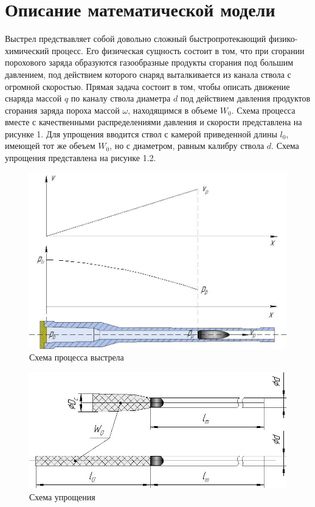 \documentclass[14pt, a4paper]{extreport} %
\begin{document}
\section{Описание математической модели}

Выстрел предствавляет собой довольно сложный быстропротекающий физико-химический процесс. Его физическая сущность состоит в том, что при сгорании порохового заряда образуются газообразные продукты сгорания под большим давлением, 
под действием которого снаряд выталкивается из канала ствола с огромной скоростью. Прямая задача состоит в том, чтобы описать движение снаряда массой $q$ по каналу ствола диаметра $d$ под действием давления продуктов сгорания заряда пороха массой $\omega$, находящимся в объеме $W_0$. Схема процесса вместе с качественными распределениями давления и скорости представлена на рисунке 1.
Для упрощения вводится ствол с камерой приведенной длины $l_0$, имеющей тот же обеъем $W_0$, но с диаметром, равным калибру ствола $d$. Схема упрощения представлена на рисунке 1.2. 

\begin{figure}[h!]
\centering
\includegraphics[width=0.45\textheight]{imgs/1.jpg}
\caption{Схема процесса выстрела}
\end{figure}

\begin{figure}[h]
\centering
\includegraphics[width=0.5\textheight]{imgs/2.jpg}
\caption{Схема упрощения}
\end{figure}
\end{document}

